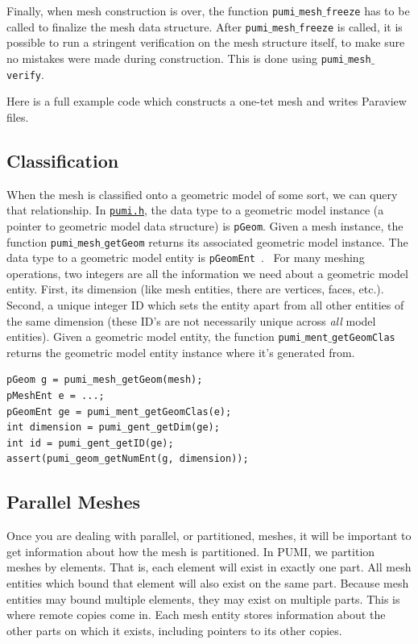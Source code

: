 \documentclass{article}
\begin{document}
{Finally, when mesh construction is over, the function
\texttt{pumi$\_$mesh$\_$freeze} has to be called to finalize the mesh data
structure.
After \texttt{pumi$\_$mesh$\_$freeze} is called, it is possible to run
a stringent verification on the mesh structure itself,
to make sure no mistakes were made during construction.
This is done using \texttt{pumi$\_$mesh$\_$verify}.

Here is a full example code which constructs a one-tet
mesh and writes Paraview files.



\subsection{Classification}

When the mesh is classified onto a geometric model of some sort, we
can query that relationship.
In \href{https://github.com/SCOREC/core/blob/master/pumi/pumi.h}
{\texttt{pumi.h}}, the data type to a geometric model instance (a pointer to
geometric model data structure) is \texttt{pGeom}.
Given a mesh instance, the function \texttt{pumi$\_$mesh$\_$getGeom} returns
its associated geometric model instance.
The data type to a geometric model entity is {\texttt{pGeomEnt}}~.
\
For many meshing operations, two integers are all the information
we need about a geometric model entity.
First, its dimension (like mesh entities, there are vertices, faces, etc.).
Second, a unique integer ID which sets the entity apart from
all other entities of the same dimension (these ID's are not necessarily
unique across \emph{all} model entities).
Given a geometric model entity, the function
\texttt{pumi$\_$ment$\_$getGeomClas} returns the geometric model entity
instance where it's generated from.

\begin{lstlisting}
pGeom g = pumi_mesh_getGeom(mesh);
pMeshEnt e = ...;
pGeomEnt ge = pumi_ment_getGeomClas(e);
int dimension = pumi_gent_getDim(ge);
int id = pumi_gent_getID(ge);
assert(pumi_geom_getNumEnt(g, dimension));
\end{lstlisting}

\subsection{Parallel Meshes}

Once you are dealing with parallel, or partitioned, meshes,
it will be important to get information about how the
mesh is partitioned.
In PUMI, we partition meshes by elements.
That is, each element will exist in exactly one part.
All mesh entities which bound that element will also exist on
the same part.
Because mesh entities may bound multiple elements, they may
exist on multiple parts.
This is where remote copies come in.
Each mesh entity stores information about the other parts
on which it exists, including pointers to its other copies.

}
\end{document}
